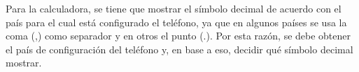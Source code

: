 \begin{itemize}
Para la calculadora, se tiene que mostrar el símbolo decimal de acuerdo con el país para el cual está configurado el teléfono, ya que en algunos países se usa la coma (,) como separador y en otros el punto (.). Por esta razón, se debe obtener el país de configuración del teléfono y, en base a eso, decidir qué símbolo decimal mostrar.

\end{itemize}
%
%
%
%
%
%
